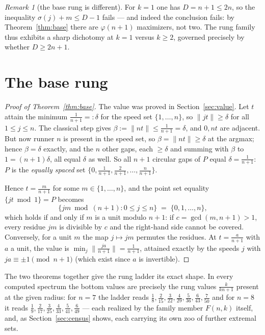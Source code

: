 \documentclass[11pt,a4paper]{article}
\theoremstyle{plain}
\theoremstyle{definition}
\theoremstyle{remark}
\newtheorem{remark}[theorem]{Remark}
\newcommand{\norm}[1]{\lVert #1 \rVert}
\begin{document}
\begin{remark}[the base rung is different]\label{rem:base-contrast}
For $k = 1$ one has $D = n + 1 \le 2n$, so the inequality
$\sigma(j) + m \le D - 1$ fails --- and indeed the conclusion fails:
by Theorem~\ref{thm:base} there are $\varphi(n+1)$ maximizers, not two.
The rung family thus exhibits a sharp dichotomy at $k = 1$ versus $k \ge 2$,
governed precisely by whether $D \ge 2n+1$.
\end{remark}

\section{The base rung}\label{sec:base}

\begin{proof}[Proof of Theorem~\ref{thm:base}]
The value was proved in Section~\ref{sec:value}. Let $t$ attain the minimum
$\tfrac{1}{n+1} =: \delta$ for the speed set $\{1, \dots, n\}$, so
$\norm{jt} \ge \delta$ for all $1 \le j \le n$. The classical step gives
$\beta := \norm{nt} \le \tfrac1{n+1} = \delta$, and $0, nt$ are adjacent. But
now runner $n$ is present in the speed set, so $\beta = \norm{nt} \ge
\delta$ at the argmax; hence $\beta = \delta$ exactly, and the $n$ other
gaps, each $\ge \delta$ and summing with $\beta$ to $1 = (n+1)\delta$, all
equal $\delta$ as well. So all $n+1$ circular gaps of $P$ equal $\delta =
\tfrac1{n+1}$: $P$ is the \emph{equally spaced} set $\{0, \tfrac1{n+1},
\tfrac2{n+1}, \dots, \tfrac{n}{n+1}\}$.

Hence $t = \tfrac{m}{n+1}$ for some $m \in \{1, \dots, n\}$, and the point
set equality $\{jt \bmod 1\} = P$ becomes
\[
  \{ jm \bmod (n+1) : 0 \le j \le n \} \;=\; \{0, 1, \dots, n\},
\]
which holds if and only if $m$ is a unit modulo $n+1$: if
$c = \gcd(m, n+1) > 1$, every residue $jm$ is divisible by $c$ and the
right-hand side cannot be covered. Conversely, for a unit $m$ the map $j
\mapsto jm$ permutes the residues. At $t = \tfrac{a}{n+1}$ with $a$ a unit,
the value is $\min_j \norm{\tfrac{ja}{n+1}} = \tfrac{1}{n+1}$, attained
exactly by the speeds $j$ with $ja \equiv \pm 1 \pmod{n+1}$ (which exist
since $a$ is invertible).
\end{proof}

The two theorems together give the rung ladder its exact shape. In every
computed spectrum the bottom values are precisely the rung values
$\tfrac{k}{kn+1}$ present at the given radius: for $n = 7$ the ladder reads
$\tfrac18, \tfrac2{15}, \tfrac3{22}, \tfrac4{29}, \tfrac5{36}, \tfrac6{43},
\tfrac7{50}$ and for $n = 8$ it reads $\tfrac19, \tfrac2{17}, \tfrac3{25},
\tfrac4{33}, \tfrac5{41}, \tfrac6{49}$ --- each realized by the family member
$F(n,k)$ itself, and, as Section~\ref{sec:census} shows, each carrying its
own zoo of further extremal sets.
\end{document}
